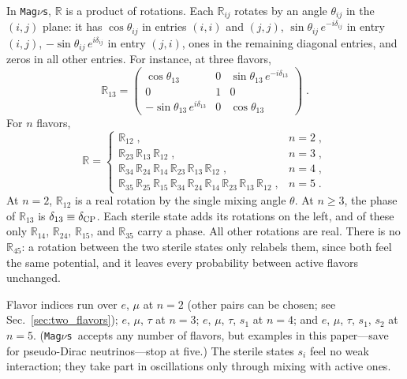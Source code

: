 \documentclass[final,5p,times,twocolumn,sort,compress]{elsarticle}
\makeatletter
\DeclareRobustCommand{\_}{%
  \ifmmode\nfss@text{\textunderscore}\else\textunderscore\allowbreak\fi}
\newcommand{\magnus}{{\tt Mag}\ensuremath{\nu}{\tt s}}
\makeatother
\begin{document}
In \magnus, $\mathbb{R}$ is a product of rotations. Each $\mathbb{R}_{ij}$ rotates by an angle $\theta_{ij}$ in the $(i,j)$ plane: it has $\cos\theta_{ij}$ in entries $(i,i)$ and $(j,j)$, $\sin\theta_{ij}\,e^{-i\delta_{ij}}$ in entry $(i,j)$, $-\sin\theta_{ij}\,e^{i\delta_{ij}}$ in entry $(j,i)$, ones in the remaining diagonal entries, and zeros in all other entries. For instance, at three flavors,
\begin{equation}
 \label{equ:rotation_example}
 \mathbb{R}_{13}
 =
 \begin{pmatrix}
  \cos\theta_{13} & 0 & \sin\theta_{13}\, e^{-i\delta_{13}} \\
  0 & 1 & 0 \\
  -\sin\theta_{13}\, e^{i\delta_{13}} & 0 & \cos\theta_{13}
 \end{pmatrix} \;.
\end{equation}
For $n$ flavors,
\begin{equation}
 \label{equ:mixing_matrix}
 \mathbb{R}
 =
 \begin{cases}
  \mathbb{R}_{12} \;, & n = 2 \;, \\
  \mathbb{R}_{23}\, \mathbb{R}_{13}\, \mathbb{R}_{12} \;, & n = 3 \;, \\
  \mathbb{R}_{34}\, \mathbb{R}_{24}\, \mathbb{R}_{14}\, \mathbb{R}_{23}\, \mathbb{R}_{13}\, \mathbb{R}_{12} \;, & n = 4 \;, \\
  \mathbb{R}_{35}\, \mathbb{R}_{25}\, \mathbb{R}_{15}\, \mathbb{R}_{34}\, \mathbb{R}_{24}\, \mathbb{R}_{14}\, \mathbb{R}_{23}\, \mathbb{R}_{13}\, \mathbb{R}_{12} \;, & n = 5 \;.
 \end{cases}
\end{equation}
At $n = 2$, $\mathbb{R}_{12}$ is a real rotation by the single mixing angle $\theta$. At $n \geq 3$, the phase of $\mathbb{R}_{13}$ is $\delta_{13} \equiv \delta_{\rm CP}$. Each sterile state adds its rotations on the left, and of these only $\mathbb{R}_{14}$, $\mathbb{R}_{24}$, $\mathbb{R}_{15}$, and $\mathbb{R}_{35}$ carry a phase. All other rotations are real. There is no $\mathbb{R}_{45}$: a rotation between the two sterile states only relabels them, since both feel the same potential, and it leaves every probability between active flavors unchanged.

Flavor indices run over $e$, $\mu$ at $n = 2$ (other pairs can be chosen; see Sec.~\ref{sec:two_flavors}); $e$, $\mu$, $\tau$ at $n = 3$; $e$, $\mu$, $\tau$, $s_1$ at $n = 4$; and $e$, $\mu$, $\tau$, $s_1$, $s_2$ at $n = 5$. (\magnus\ accepts any number of flavors, but examples in this paper---save for pseudo-Dirac neutrinos---stop at five.) The sterile states $s_i$ feel no weak interaction; they take part in oscillations only through mixing with active ones.
\end{document}
